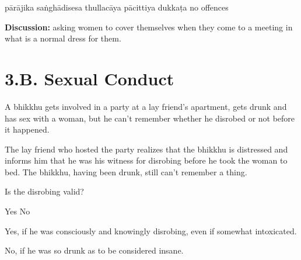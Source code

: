 \begin{exam}{\autoExamName}
\begin{problem*}
\begin{parts}
  \begin{answers}{6}
    \bChoices
     pārājika\eAns
     saṅghādisesa\eAns
     thullacāya\eAns
     pācittiya\eAns
     dukkaṭa\eAns
     no offences\eAns
    \eChoices
  \end{answers}

  \bigskip

  \textbf{Discussion:} asking women to cover themselves when they come to a
  meeting in what is a normal dress for them.

  \bigskip

\end{parts}

\end{problem*}

\end{exam}

\chapter{3.B. Sexual Conduct}
\renewcommand*{\theChapterTitle}{3.B. Sexual Conduct}

\begin{exam}{\autoExamName}

\begin{problem}
  A bhikkhu gets involved in a party at a lay friend's apartment, gets drunk and has sex with a woman,
  but he can't remember whether he disrobed or not before it happened.

  \bigskip

  The lay friend who hosted the party realizes that the bhikkhu is distressed
  and informs him that he was his witness for disrobing
  before he took the woman to bed.
  The bhikkhu, having been drunk, still can't remember a thing.

  \bigskip

  Is the disrobing valid?

  \bigskip

  \begin{answers}{2}
    \bChoices
     Yes\eAns
     No\eAns
    \eChoices
  \end{answers}

  \begin{solution}
    Yes, if he was consciously and knowingly disrobing, even if somewhat intoxicated.

    No, if he was so drunk as to be considered insane.
  \end{solution}

\end{problem}

\end{exam}
